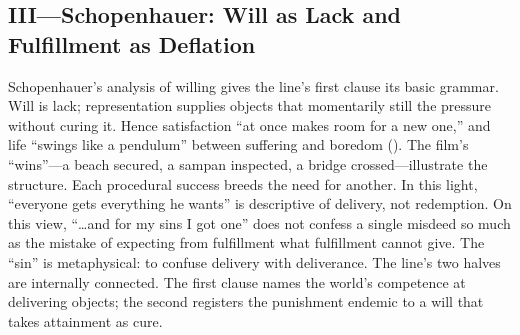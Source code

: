 \subsection*{III—Schopenhauer: Will as Lack and Fulfillment as Deflation}
\label{ssec:iii-schopenhauer}
Schopenhauer’s analysis of willing gives the line’s first clause its basic grammar. Will is lack; representation supplies objects that momentarily still the pressure without curing it. Hence satisfaction “at once makes room for a new one,” and life “swings like a pendulum” between suffering and boredom (\parencite[pp.~312, 319]{SchopenhauerWWR1969}). The film’s “wins”—a beach secured, a sampan inspected, a bridge crossed—illustrate the structure. Each procedural success breeds the need for another. In this light, “everyone gets everything he wants” is descriptive of delivery, not redemption.
On this view, “…and for my sins I got one” does not confess a single misdeed so much as the mistake of expecting from fulfillment what fulfillment cannot give. The “sin” is metaphysical: to confuse delivery with deliverance. The line’s two halves are internally connected. The first clause names the world’s competence at delivering objects; the second registers the punishment endemic to a will that takes attainment as cure.
